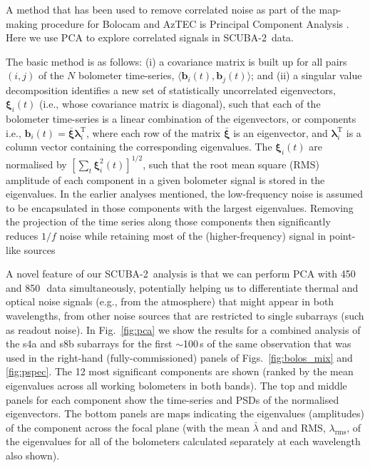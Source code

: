 \documentclass[useAMS,usenatbib,nofootinbib]{mn2e}
\newcommand{\scuba}{SCUBA-2}
\newcommand{\rms}{RMS}
\begin{document}
A method that has been used to remove correlated noise as part of the
map-making procedure for Bolocam and AzTEC is Principal Component
Analysis \citep[PCA,][]{laurent2005,scott2008,perera2008}. Here we use
PCA to explore correlated signals in \scuba\ data.

The basic method is as follows: (i) a covariance matrix is built up
for all pairs $(i,j)$ of the $N$ bolometer time-series,
$\langle\mathbf{b}_i(t),\mathbf{b}_j(t)\rangle$; and (ii) a singular
value decomposition identifies a new set of statistically uncorrelated
eigenvectors, $\mathbf{\xi}_i(t)$ (i.e., whose covariance matrix is
diagonal), such that each of the bolometer time-series is a linear
combination of the eigenvectors, or components i.e., $\mathbf{b}_i(t)
= \bar{\mathbf{\xi}} \mathbf{\lambda}_i^\mathrm{T}$, where each row of
the matrix $\bar{\mathbf{\xi}}$ is an eigenvector, and
$\mathbf{\lambda}_i^\mathrm{T}$ is a column vector containing the
corresponding eigenvalues. The $\mathbf{\xi}_i(t)$ are normalised by
$[\sum_t \mathbf{\xi}_i^2(t)]^{1/2}$, such that the root mean square
(\rms) amplitude of each component in a given bolometer signal is
stored in the eigenvalues. In the earlier analyses mentioned, the
low-frequency noise is assumed to be encapsulated in those components
with the largest eigenvalues. Removing the projection of the time
series along those components then significantly reduces $1/f$ noise
while retaining most of the (higher-frequency) signal in point-like
sources

A novel feature of our \scuba\ analysis is that we can perform PCA
with 450 and 850\,\micron\ data simultaneously, potentially helping us
to differentiate thermal and optical noise signals (e.g., from the
atmosphere) that might appear in both wavelengths, from other noise
sources that are restricted to single subarrays (such as readout
noise). In Fig.~\ref{fig:pca} we show the results for a combined
analysis of the s4a and s8b subarrays for the first $\sim$100\,s of
the same observation that was used in the right-hand
(fully-commissioned) panels of Figs.~\ref{fig:bolos_mix} and
\ref{fig:pspec}. The 12 most significant components are shown (ranked
by the mean eigenvalues across all working bolometers in both
bands). The top and middle panels for each component show the
time-series and PSDs of the normalised eigenvectors. The bottom panels
are maps indicating the eigenvalues (amplitudes) of the component
across the focal plane (with the mean $\bar{\lambda}$ and and \rms,
$\lambda_\mathrm{rms}$, of the eigenvalues for all of the bolometers
calculated separately at each wavelength also shown).
\end{document}
